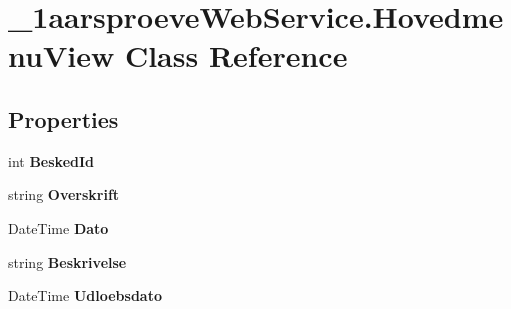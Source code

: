 \hypertarget{class__1aarsproeve_web_service_1_1_hovedmenu_view}{}\section{\+\_\+1aarsproeve\+Web\+Service.\+Hovedmenu\+View Class Reference}
\label{class__1aarsproeve_web_service_1_1_hovedmenu_view}
\subsection*{Properties}
\begin{DoxyCompactItemize}
\item 
\hypertarget{class__1aarsproeve_web_service_1_1_hovedmenu_view_a3cdc1eba15edca95f88ecc71c2cebbe5}{}int {\bfseries Besked\+Id}\label{class__1aarsproeve_web_service_1_1_hovedmenu_view_a3cdc1eba15edca95f88ecc71c2cebbe5}

\item 
\hypertarget{class__1aarsproeve_web_service_1_1_hovedmenu_view_a535e60e0c9a2dd8af428fcdfd19c7d08}{}string {\bfseries Overskrift}\label{class__1aarsproeve_web_service_1_1_hovedmenu_view_a535e60e0c9a2dd8af428fcdfd19c7d08}

\item 
\hypertarget{class__1aarsproeve_web_service_1_1_hovedmenu_view_a88a629d246e6a6216d8cf114b7c60eab}{}Date\+Time {\bfseries Dato}\label{class__1aarsproeve_web_service_1_1_hovedmenu_view_a88a629d246e6a6216d8cf114b7c60eab}

\item 
\hypertarget{class__1aarsproeve_web_service_1_1_hovedmenu_view_af4cc32776a0332540d57561e5e73e806}{}string {\bfseries Beskrivelse}\label{class__1aarsproeve_web_service_1_1_hovedmenu_view_af4cc32776a0332540d57561e5e73e806}

\item 
\hypertarget{class__1aarsproeve_web_service_1_1_hovedmenu_view_ae95fd39657a2f63449f32eee7f73e1a9}{}Date\+Time {\bfseries Udloebsdato}\label{class__1aarsproeve_web_service_1_1_hovedmenu_view_ae95fd39657a2f63449f32eee7f73e1a9}


\end{DoxyCompactItemize}
